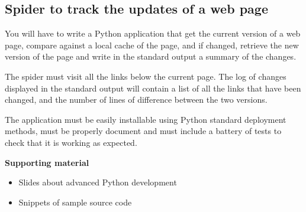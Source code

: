 \documentclass[a4paper]{article}
\begin{document}
\subsection{Spider to track the updates of a web page}
\label{sub:python}

You will have to write a Python application that get the current
version of a web page, compare against a local cache of the page, and
if changed, retrieve the new version of the page and write in the
standard output a summary of the changes.

The spider must visit all the links below the current page. The log of
changes displayed in the standard output will contain a list of all
the links that have been changed, and the number of lines of
difference between the two versions.

The application must be easily installable using Python standard
deployment methods, must be properly document and must include a
battery of tests to check that it is working as expected.

\textbf{Supporting material}

\begin{itemize}
\item Slides about advanced Python development
\item Snippets of sample source code
\end{itemize}


\end{document}
